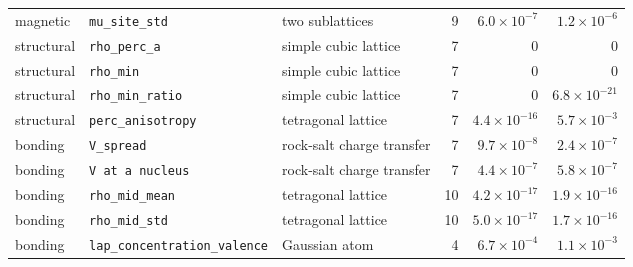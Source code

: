 \begin{table}[htbp]
\begin{tabular}{llp{4.2cm}rrr}
magnetic & \texttt{mu\_site\_std} & two sublattices & 9 & $6.0\times10^{-7}$ & $1.2\times10^{-6}$ \\
structural & \texttt{rho\_perc\_a} & simple cubic lattice & 7 & $0$ & $0$ \\
structural & \texttt{rho\_min} & simple cubic lattice & 7 & $0$ & $0$ \\
structural & \texttt{rho\_min\_ratio} & simple cubic lattice & 7 & $0$ & $6.8\times10^{-21}$ \\
structural & \texttt{perc\_anisotropy} & tetragonal lattice & 7 & $4.4\times10^{-16}$ & $5.7\times10^{-3}$ \\
bonding & \texttt{V\_spread} & rock-salt charge transfer & 7 & $9.7\times10^{-8}$ & $2.4\times10^{-7}$ \\
bonding & \texttt{V at a nucleus} & rock-salt charge transfer & 7 & $4.4\times10^{-7}$ & $5.8\times10^{-7}$ \\
bonding & \texttt{rho\_mid\_mean} & tetragonal lattice & 10 & $4.2\times10^{-17}$ & $1.9\times10^{-16}$ \\
bonding & \texttt{rho\_mid\_std} & tetragonal lattice & 10 & $5.0\times10^{-17}$ & $1.7\times10^{-16}$ \\
bonding & \texttt{lap\_concentration\_valence} & Gaussian atom & 4 & $6.7\times10^{-4}$ & $1.1\times10^{-3}$ \\
\bottomrule
\end{tabular}
\end{table}

